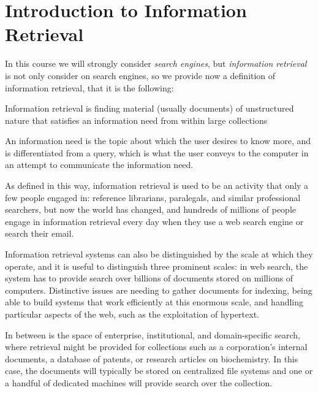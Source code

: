 \chapter{Introduction to Information Retrieval}
In this course we will strongly consider \emph{search engines}, but \emph{information retrieval} is not
only consider on search engines, so we provide now a definition 
of information retrieval, that it is the following:

\begin{defi}
Information retrieval is finding material (usually documents) of unstructured nature that satisfies
an information need from within large collections
\end{defi}
An information need is the topic about which the user desires to know more, and is differentiated from a query,
which is what the user conveys to the computer in an attempt to communicate the information need.

As defined in this way, information retrieval is used to be an activity that only a few people engaged in:
reference librarians, paralegals, and similar professional searchers, but now the world has changed,
and hundreds of millions of people engage in information retrieval every day when 
they use a web search engine or search their email.

Information retrieval systems can also be distinguished by the scale at
which they operate, and it is useful to distinguish three prominent scales:
in web search, the system has to provide search over billions of documents
stored on millions of computers. Distinctive issues are needing to gather
documents for indexing, being able to build systems that work efficiently
at this enormous scale, and handling particular aspects of the web, such as
the exploitation of hypertext.

In between is the space of enterprise,
institutional, and domain-specific search, where retrieval might be provided for
collections such as a corporation’s internal documents, a database of patents,
or research articles on biochemistry. In this case, the documents will typically be stored on
centralized file systems and one or a handful of dedicated
machines will provide search over the collection.


